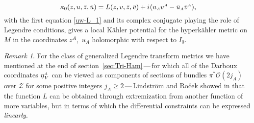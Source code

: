 \documentclass[11pt]{amsart}
\theoremstyle{remark}
\newtheorem*{remark}{Remark}
\theoremstyle{remark}
\theoremstyle{definition}
\theoremstyle{definition}
\theoremstyle{definition}
\newcommand{\0}{{\scriptstyle 0'}} %
\newcommand{\1}{{\scriptstyle 1'}}
\newcommand{\A}{{\scriptscriptstyle A}} %
\newcommand{\hp}{\hspace{0.5pt}} %
\begin{document}
\begin{equation}
\kappa_0(z,u,\bar{z},\bar{u}) = L(z,v,\bar{z},\bar{v}) + i \hp (u_{\A}v^{\A} - \bar{u}_{\A}\bar{v}^{\A}) \rlap{,}
\end{equation}
with the first equation \eqref{uw-L_1} and its complex conjugate playing the role of Legendre conditions, gives a local K\"ahler potential for the hyperk\"ahler metric on $M$ in the coordinates \mbox{$z^{\A}$, $u_{\A}$} holomorphic with respect to $I_0$. 

\begin{remark}
For the class of generalized Legendre transform metrics we have mentioned at the end of \mbox{section \ref{sec:Tri-Ham}}\,---\,for which all of the Darboux coordinates $\eta^{\A}_{\hp V}$ can be viewed as components of sections of bundles $\pi^*\mathcal{O}(2j_{\A})$ over $\mathcal{Z}$ for some positive integers $j_{\A} \geq 2$\,---\,Lindstr\"om and Ro\v{c}ek showed in \cite{MR929144} that the function $L$ can be obtained through extremization from another function of more variables, but in terms of which the differential constraints can be expressed \textit{linearly}. 
\end{remark}
\end{document}
